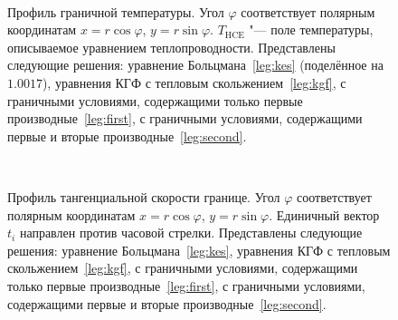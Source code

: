 \documentclass[
aps,%
12pt,%
final,%
notitlepage,%
oneside,%
onecolumn,%
nobibnotes,%
nofootinbib,%
superscriptaddress,%
noshowpacs,%
showkeys,%
floatfix,%
tightenlines,%
centertags]%
{revtex4}
\begin{document}
\begin{figure}
    \setcounter{subfigure}{0}
    \centering
    \\
    \caption{
        Профиль граничной температуры. Угол \(\varphi\) соответствует полярным координатам
        \(x=r\cos\varphi\), \(y=r\sin\varphi\). \(T_{\mathrm{HCE}}\) "--- поле температуры,
        описываемое уравнением теплопроводности.
        Представлены следующие решения: уравнение Больцмана~\ref{leg:kes} (поделённое на \(1.0017\)),
        уравнения КГФ с тепловым скольжением~\ref{leg:kgf},
        с граничными условиями, содержащими только первые производные~\ref{leg:first},
        с граничными условиями, содержащими первые и вторые производные~\ref{leg:second}.
    }
    \label{fig:profile-temp}
\end{figure}

\begin{figure}
    \centering
    \\
    \caption{
        Профиль тангенциальной скорости границе. Угол \(\varphi\) соответствует полярным координатам
        \(x=r\cos\varphi\), \(y=r\sin\varphi\). Единичный вектор \(t_i\) направлен против часовой стрелки.
        Представлены следующие решения: уравнение Больцмана~\ref{leg:kes},
        уравнения КГФ с тепловым скольжением~\ref{leg:kgf},
        с граничными условиями, содержащими только первые производные~\ref{leg:first},
        с граничными условиями, содержащими первые и вторые производные~\ref{leg:second}.
    }
    \label{fig:profile-vel}
\end{figure}
\end{document}

